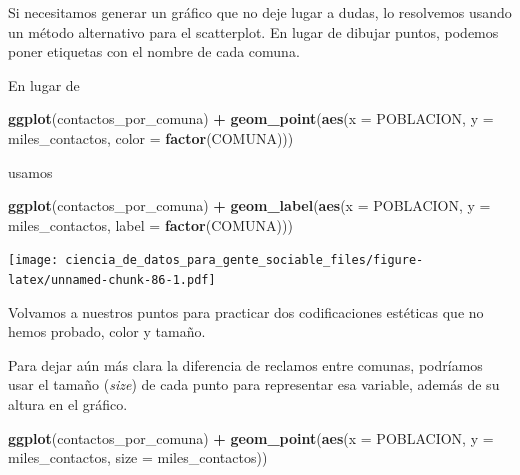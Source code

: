 \documentclass[]{book}
\newenvironment{Shaded}{\begin{snugshade}}{\end{snugshade}}
\newcommand{\KeywordTok}[1]{\textcolor[rgb]{0.13,0.29,0.53}{\textbf{#1}}}
\newcommand{\DataTypeTok}[1]{\textcolor[rgb]{0.13,0.29,0.53}{#1}}
\newcommand{\StringTok}[1]{\textcolor[rgb]{0.31,0.60,0.02}{#1}}
\newcommand{\OperatorTok}[1]{\textcolor[rgb]{0.81,0.36,0.00}{\textbf{#1}}}
\newcommand{\NormalTok}[1]{#1}
\begin{document}
Si necesitamos generar un gráfico que no deje lugar a dudas, lo
resolvemos usando un método alternativo para el scatterplot. En lugar de
dibujar puntos, podemos poner etiquetas con el nombre de cada comuna.

En lugar de

\begin{Shaded}
\begin{Highlighting}[]
\KeywordTok{ggplot}\NormalTok{(contactos_por_comuna) }\OperatorTok{+}\StringTok{ }
\StringTok{    }\KeywordTok{geom_point}\NormalTok{(}\KeywordTok{aes}\NormalTok{(}\DataTypeTok{x =}\NormalTok{ POBLACION, }\DataTypeTok{y =}\NormalTok{ miles_contactos, }\DataTypeTok{color =} \KeywordTok{factor}\NormalTok{(COMUNA)))}
\end{Highlighting}
\end{Shaded}

usamos

\begin{Shaded}
\begin{Highlighting}[]
\KeywordTok{ggplot}\NormalTok{(contactos_por_comuna) }\OperatorTok{+}
\StringTok{    }\KeywordTok{geom_label}\NormalTok{(}\KeywordTok{aes}\NormalTok{(}\DataTypeTok{x =}\NormalTok{ POBLACION, }\DataTypeTok{y =}\NormalTok{ miles_contactos, }\DataTypeTok{label =} \KeywordTok{factor}\NormalTok{(COMUNA)))}
\end{Highlighting}
\end{Shaded}

\texttt{[image: ciencia\_de\_datos\_para\_gente\_sociable\_files/figure-latex/unnamed-chunk-86-1.pdf]}

Volvamos a nuestros puntos para practicar dos codificaciones estéticas
que no hemos probado, color y tamaño.

Para dejar aún más clara la diferencia de reclamos entre comunas,
podríamos usar el tamaño (\emph{size}) de cada punto para representar
esa variable, además de su altura en el gráfico.

\begin{Shaded}
\begin{Highlighting}[]
\KeywordTok{ggplot}\NormalTok{(contactos_por_comuna) }\OperatorTok{+}\StringTok{ }
\StringTok{    }\KeywordTok{geom_point}\NormalTok{(}\KeywordTok{aes}\NormalTok{(}\DataTypeTok{x =}\NormalTok{ POBLACION, }\DataTypeTok{y =}\NormalTok{ miles_contactos, }\DataTypeTok{size =}\NormalTok{ miles_contactos))}
\end{Highlighting}
\end{Shaded}
\end{document}
